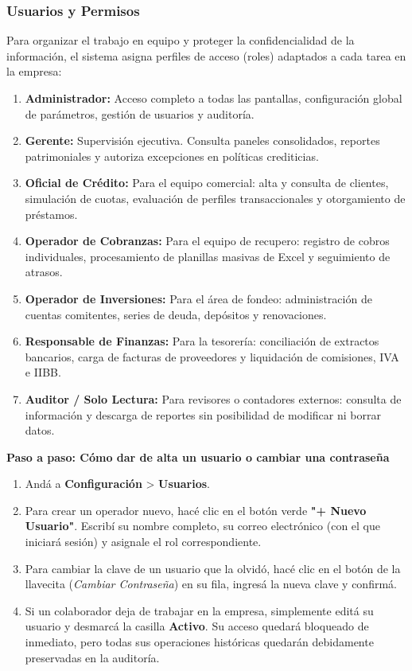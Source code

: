 \documentclass[12pt,a4paper]{article}
\renewcommand{\_}{\textunderscore\allowbreak}
\begin{document}
\subsubsection{Usuarios y Permisos}
Para organizar el trabajo en equipo y proteger la confidencialidad de la información, el sistema asigna perfiles de acceso (roles) adaptados a cada tarea en la empresa:

\begin{enumerate}
    \item \textbf{Administrador:} Acceso completo a todas las pantallas, configuración global de parámetros, gestión de usuarios y auditoría.
    \item \textbf{Gerente:} Supervisión ejecutiva. Consulta paneles consolidados, reportes patrimoniales y autoriza excepciones en políticas crediticias.
    \item \textbf{Oficial de Crédito:} Para el equipo comercial: alta y consulta de clientes, simulación de cuotas, evaluación de perfiles transaccionales y otorgamiento de préstamos.
    \item \textbf{Operador de Cobranzas:} Para el equipo de recupero: registro de cobros individuales, procesamiento de planillas masivas de Excel y seguimiento de atrasos.
    \item \textbf{Operador de Inversiones:} Para el área de fondeo: administración de cuentas comitentes, series de deuda, depósitos y renovaciones.
    \item \textbf{Responsable de Finanzas:} Para la tesorería: conciliación de extractos bancarios, carga de facturas de proveedores y liquidación de comisiones, IVA e IIBB.
    \item \textbf{Auditor / Solo Lectura:} Para revisores o contadores externos: consulta de información y descarga de reportes sin posibilidad de modificar ni borrar datos.
\end{enumerate}

\textbf{Paso a paso: Cómo dar de alta un usuario o cambiar una contraseña}
\begin{enumerate}
    \item Andá a \textbf{Configuración} > \textbf{Usuarios}.
    \item Para crear un operador nuevo, hacé clic en el botón verde \textbf{"+ Nuevo Usuario"}. Escribí su nombre completo, su correo electrónico (con el que iniciará sesión) y asignale el rol correspondiente.
    \item Para cambiar la clave de un usuario que la olvidó, hacé clic en el botón de la llavecita (\textit{Cambiar Contraseña}) en su fila, ingresá la nueva clave y confirmá.
    \item Si un colaborador deja de trabajar en la empresa, simplemente editá su usuario y desmarcá la casilla \textbf{Activo}. Su acceso quedará bloqueado de inmediato, pero todas sus operaciones históricas quedarán debidamente preservadas en la auditoría.
\end{enumerate}
\end{document}
